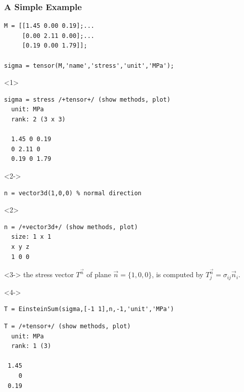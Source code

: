 \documentclass[compress]{beamer}
\begin{document}
\begin{frame}[fragile]
  \frametitle{A Simple Example}

  \begin{overlayarea}{\textwidth}{\textheight}

    \vspace{-.3cm}
  \begin{lstlisting}[style=input]
M = [[1.45 0.00 0.19];...
     [0.00 2.11 0.00];...
     [0.19 0.00 1.79]];

sigma = tensor(M,'name','stress','unit','MPa');
\end{lstlisting}
  \vspace{-.3cm}
\begin{onlyenv}<1>
  \begin{lstlisting}[style=output]
sigma = stress /+tensor+/ (show methods, plot)
  unit: MPa
  rank: 2 (3 x 3)

  1.45 0 0.19
  0 2.11 0
  0.19 0 1.79
  \end{lstlisting}
\end{onlyenv}

\medskip
\begin{onlyenv}<2->
\begin{lstlisting}[style=input]
n = vector3d(1,0,0) % normal direction
\end{lstlisting}
  \vspace{-.3cm}
\end{onlyenv}
\begin{onlyenv}<2>
  \begin{lstlisting}[style=output]
n = /+vector3d+/ (show methods, plot)
  size: 1 x 1
  x y z
  1 0 0
  \end{lstlisting}
\end{onlyenv}

\bigskip

\begin{onlyenv}<3->
the stress vector $T^{\vec n}$ of plane $\vec n = \{1,0,0\}$, is computed by
$T^{\vec n}_{j} = \sigma_{ij} \vec n_{i}.$
\end{onlyenv}

\medskip

\begin{onlyenv}<4->
\begin{lstlisting}[style=input]
T = EinsteinSum(sigma,[-1 1],n,-1,'unit','MPa')
\end{lstlisting}
  \vspace{-.3cm}
\begin{lstlisting}[style=output]
T = /+tensor+/ (show methods, plot)
  unit: MPa
  rank: 1 (3)

 1.45
    0
 0.19
\end{lstlisting}
\end{onlyenv}
\end{overlayarea}

\end{frame}
\end{document}
